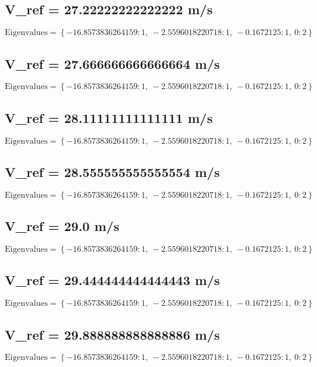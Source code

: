 \documentclass{article}
\begin{document}
\subsection*{V_ref = 27.22222222222222 m/s}
\begin{equation}
\text{Eigenvalues} = \left\{ -16.8573836264159 : 1, \  -2.5596018220718 : 1, \  -0.1672125 : 1, \  0 : 2\right\}
\end{equation}
\subsection*{V_ref = 27.666666666666664 m/s}
\begin{equation}
\text{Eigenvalues} = \left\{ -16.8573836264159 : 1, \  -2.5596018220718 : 1, \  -0.1672125 : 1, \  0 : 2\right\}
\end{equation}
\subsection*{V_ref = 28.11111111111111 m/s}
\begin{equation}
\text{Eigenvalues} = \left\{ -16.8573836264159 : 1, \  -2.5596018220718 : 1, \  -0.1672125 : 1, \  0 : 2\right\}
\end{equation}
\subsection*{V_ref = 28.555555555555554 m/s}
\begin{equation}
\text{Eigenvalues} = \left\{ -16.8573836264159 : 1, \  -2.5596018220718 : 1, \  -0.1672125 : 1, \  0 : 2\right\}
\end{equation}
\subsection*{V_ref = 29.0 m/s}
\begin{equation}
\text{Eigenvalues} = \left\{ -16.8573836264159 : 1, \  -2.5596018220718 : 1, \  -0.1672125 : 1, \  0 : 2\right\}
\end{equation}
\subsection*{V_ref = 29.444444444444443 m/s}
\begin{equation}
\text{Eigenvalues} = \left\{ -16.8573836264159 : 1, \  -2.5596018220718 : 1, \  -0.1672125 : 1, \  0 : 2\right\}
\end{equation}
\subsection*{V_ref = 29.888888888888886 m/s}
\begin{equation}
\text{Eigenvalues} = \left\{ -16.8573836264159 : 1, \  -2.5596018220718 : 1, \  -0.1672125 : 1, \  0 : 2\right\}
\end{equation}
\end{document}
